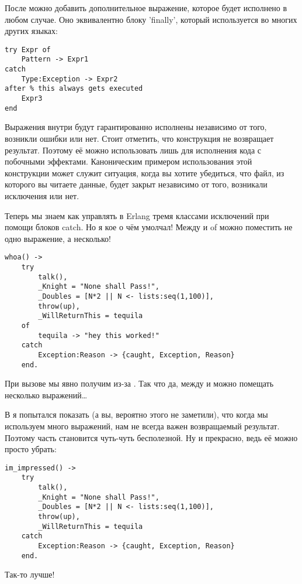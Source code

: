 После  можно добавить дополнительное выражение, которое будет исполнено в любом случае.
Оно эквивалентно блоку 'finally', который используется во многих других языках:
\begin{lstlisting}[style=erlang]
try Expr of
    Pattern -> Expr1
catch
    Type:Exception -> Expr2
after % this always gets executed
    Expr3
end
\end{lstlisting}

Выражения внутри  будут гарантированно исполнены независимо от того, возникли ошибки или нет.
Стоит отметить, что конструкция  не возвращает результат.
Поэтому её можно использовать лишь для исполнения кода с побочными эффектами.
Каноническим примером использования этой конструкции может служит ситуация, когда вы хотите убедиться, что файл, из которого вы читаете данные, будет закрыт независимо от того, возникали исключения или нет.

Теперь мы знаем как управлять в Erlang тремя классами исключений при помощи блоков catch.
Но я кое о чём умолчал!
Между  и {of} можно поместить не одно выражение, а несколько!
\begin{lstlisting}[style=erlang]
whoa() ->
    try
        talk(),
        _Knight = "None shall Pass!",
        _Doubles = [N*2 || N <- lists:seq(1,100)],
        throw(up),
        _WillReturnThis = tequila
    of
        tequila -> "hey this worked!"
    catch
        Exception:Reason -> {caught, Exception, Reason}
    end.
\end{lstlisting}

При вызове  мы явно получим  из\--за .
Так что да, между  и  можно помещать несколько выражений\ldots

В  я попытался показать (а вы, вероятно этого не заметили), что когда мы используем много выражений, нам не всегда важен возвращаемый результат.
Поэтому часть  становится чуть\--чуть бесполезной.
Ну и прекрасно, ведь её можно просто убрать:
\begin{lstlisting}[style=erlang]
im_impressed() ->
    try
        talk(),
        _Knight = "None shall Pass!",
        _Doubles = [N*2 || N <- lists:seq(1,100)],
        throw(up),
        _WillReturnThis = tequila
    catch
        Exception:Reason -> {caught, Exception, Reason}
    end.
\end{lstlisting}

Так\--то лучше!

